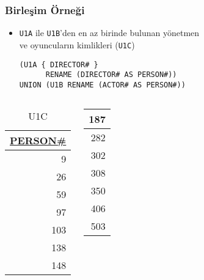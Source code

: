 \documentclass[dvipsnames]{beamer}
\theoremstyle{plain}
\begin{document}
\begin{frame}[fragile]
  \frametitle{Birleşim Örneği}

    \begin{itemize}
      \item \texttt{U1A} ile \texttt{U1B}'den en az birinde bulunan yönetmen\\
        ve oyuncuların kimlikleri (\texttt{U1C})
    

    \begin{lstlisting}
(U1A { DIRECTOR# }
      RENAME (DIRECTOR# AS PERSON#))
UNION (U1B RENAME (ACTOR# AS PERSON#))
    \end{lstlisting}
    \end{itemize}

    \vspace{-10pt}
    \begin{columns}[b]
    \begin{tiny}
    \begin{table}
      \caption{U1C}
      \begin{tabular}{|r|}\hline
\underline{PERSON\#}\\[2pt]\hline\hline
                  9\\\hline
                 26\\\hline
                 59\\\hline
                 97\\\hline
                103\\\hline
                138\\\hline
                148\\\hline
      \end{tabular}
    \end{table}
    \end{tiny}

    \begin{tiny}
    \begin{table}
      \begin{tabular}{|r|}\hline
                187\\\hline
                282\\\hline
                302\\\hline
                308\\\hline
                350\\\hline
                406\\\hline
                503\\\hline
      \end{tabular}
    \end{table}
    \end{tiny}


\end{columns}
\end{frame}
\end{document}
